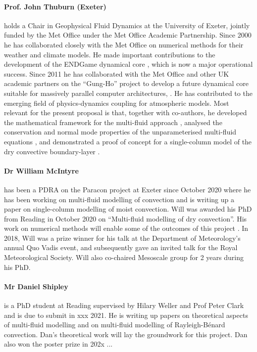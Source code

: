 \documentclass[11pt,a4paper]{article}
\begin{document}
\paragraph*{Prof. John Thuburn (Exeter)} holds a Chair in Geophysical Fluid Dynamics at the University of Exeter, jointly
funded by the Met Office under the Met Office Academic Partnership.
Since 2000 he has collaborated closely with the Met Office on numerical methods for their
weather and climate models. He made important contributions to the development of the
ENDGame dynamical core \cite[e.g.][]{WSW+14}, which is now a major operational success.
Since 2011 he has collaborated with the Met Office and other UK academic partners on the ``Gung-Ho''
project to develop a future dynamical core suitable for massively parallel computer
architectures, \citep[e.g.][]{MBS+19}.
He has contributed to the emerging field of physics-dynamics coupling for atmospheric models.
Most relevant for the present proposal is that,
together with co-authors, he developed the mathematical framework for the multi-fluid
approach \citep[][]{TWV+18}, analysed the conservation and normal mode properties
of the unparameterised multi-fluid equations \citep[][]{TV18}, and demonstrated
a proof of concept for a single-column model of the dry convective boundary-layer \citep[][]{TEB19}.

\paragraph*{Dr William McIntyre} has been a PDRA on the Paracon project at Exeter since October 2020 where he has been working on multi-fluid modelling of convection and is writing up a paper on single-column modelling of moist convection. Will was awarded his PhD from Reading in October 2020 on ``Multi-fluid modelling of dry convection''. His work on numerical methods will enable some of the outcomes of this project \cite{MWH20}. In 2018, Will was a prize winner for his talk at the Department of Meteorology's annual Quo Vadis event, and subsequently gave an invited talk for the Royal Meteorological Society. Will also co-chaired Mesoscale group for 2 years during his PhD.

\paragraph*{Mr Daniel Shipley} is a PhD student at Reading supervised by Hilary Weller and Prof Peter Clark and is due to submit in xxx 2021. He is writing up papers on theoretical aspects of multi-fluid modelling and on multi-fluid modelling of Rayleigh-B\'{e}nard convection. Dan's theoretical work will lay the groundwork for this project. Dan also won the poster prize in 202x ...
\end{document}
